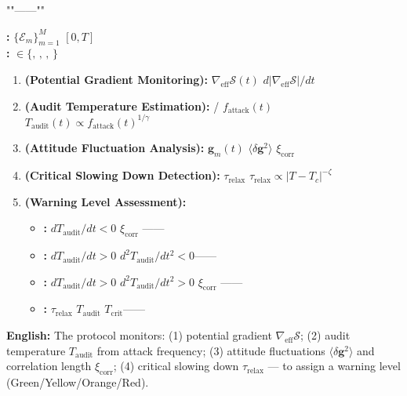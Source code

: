 \documentclass[12pt,a4paper]{article}
\theoremstyle{remark}
\newcommand{\g}{\mathbf{g}}
\begin{document}
\noindent
\textbf{} ""——""

\begin{protocol}\label{prot:early_warning}
\textbf{:}  $\{\mathcal{E}_m\}_{m=1}^M$ $[0,T]$\\
\textbf{:}  $\in \{\text{, , , }\}$

\begin{enumerate}[label=\textbf{ \arabic*}, leftmargin=*]
    \item \textbf{ (Potential Gradient Monitoring):}  $\nabla_{\mathrm{eff}}\mathcal{S}(t)$  $d|\nabla_{\mathrm{eff}}\mathcal{S}|/dt$
    \item \textbf{ (Audit Temperature Estimation):} / $f_{\mathrm{attack}}(t)$ $T_{\mathrm{audit}}(t) \propto f_{\mathrm{attack}}(t)^{1/\gamma}$
    \item \textbf{ (Attitude Fluctuation Analysis):}  $\g_m(t)$  $\langle\delta\g^2\rangle$  $\xi_{\mathrm{corr}}$
    \item \textbf{ (Critical Slowing Down Detection):}  $\tau_{\mathrm{relax}}$ $\tau_{\mathrm{relax}} \propto |T-T_c|^{-\zeta}$
    \item \textbf{ (Warning Level Assessment):}
    \begin{itemize}
        \item \textbf{:} $dT_{\mathrm{audit}}/dt < 0$  $\xi_{\mathrm{corr}}$ ——
        \item \textbf{:} $dT_{\mathrm{audit}}/dt > 0$  $d^2T_{\mathrm{audit}}/dt^2 < 0$——
        \item \textbf{:} $dT_{\mathrm{audit}}/dt > 0$  $d^2T_{\mathrm{audit}}/dt^2 > 0$ $\xi_{\mathrm{corr}}$ ——
        \item \textbf{:} $\tau_{\mathrm{relax}}$  $T_{\mathrm{audit}}$  $T_{\mathrm{crit}}$——
    \end{itemize}
\end{enumerate}
\end{protocol}

\vspace{4pt}
\noindent
\textbf{English:} The protocol monitors: (1) potential gradient $\nabla_{\mathrm{eff}}\mathcal{S}$; (2) audit temperature $T_{\mathrm{audit}}$ from attack frequency; (3) attitude fluctuations $\langle\delta\g^2\rangle$ and correlation length $\xi_{\mathrm{corr}}$; (4) critical slowing down $\tau_{\mathrm{relax}}$ — to assign a warning level (Green/Yellow/Orange/Red).

\subsection{}
\end{document}
